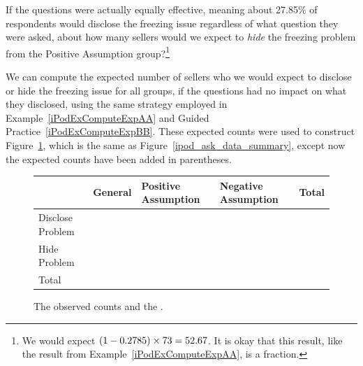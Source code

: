 \begin{exercise}\label{iPodExComputeExpBB}
If the questions were actually equally effective,
meaning about 27.85\% of respondents would disclose the
freezing issue regardless of what question they were asked,
about how many sellers would we expect to \emph{hide} the
freezing problem from the Positive Assumption
group?\footnote{We would expect
  $(1 - 0.2785{}) \times 73{} = 52.67{}$.
  It is okay that this result,
  like the result from Example~\ref{iPodExComputeExpAA},
  is a fraction.}
\end{exercise}

We can compute the expected number of sellers who we would
expect to disclose or hide the freezing issue for all groups,
if the questions had no impact on what they disclosed,
using the same strategy employed in
Example~\ref{iPodExComputeExpAA} and
Guided Practice~\ref{iPodExComputeExpBB}.
These expected counts were used to construct Figure~\ref{ipod_ask_data_summary_expected},
which is the same as Figure~\ref{ipod_ask_data_summary},
except now the expected counts have been added in parentheses.

\begin{figure}[h]
\centering
\begin{tabular}{l lll l}
  \hline
  & General & Positive Assumption &
      Negative Assumption & Total \\ 
  \hline
  Disclose Problem &
      \iPodAA{} \ \highlightO{\footnotesize(\iPodAExpected{})} &
      \iPodAB{} \highlightO{\footnotesize(\iPodAExpected{})} &
      \iPodAC{} \highlightO{\footnotesize(\iPodAExpected{})} &
      \iPodAD{} \\ 
  Hide Problem &
      \iPodBA{} \highlightO{\footnotesize(\iPodBExpected{})} &
      \iPodBB{} \highlightO{\footnotesize(\iPodBExpected{})} &
      \iPodBC{} \highlightO{\footnotesize(\iPodBExpected{})} &
      \iPodBD{} \\ 
  \hline
  Total & \iPodDA{} & \iPodDB{} &
      \iPodDC{} & \iPodDD{} \\
  \hline
\end{tabular}
\caption{The observed counts and the
    .}
\label{ipod_ask_data_summary_expected}
\end{figure}

